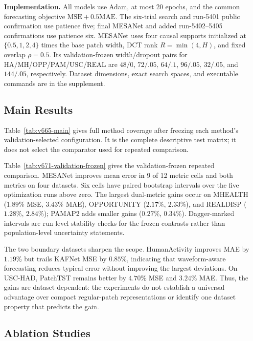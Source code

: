 \textbf{Implementation.}
All models use Adam, at most 20 epochs, and the common forecasting objective
$\mathrm{MSE}+0.5\mathrm{MAE}$. The six-trial search and run-5401 public
confirmation use patience five; final MESANet and added run-5402--5405
confirmations use patience six. MESANet uses four causal supports initialized
at $\{0.5,1,2,4\}$ times the base patch width, DCT rank $R=\min(4,H)$, and
fixed overlap $\rho=0.5$. Its validation-frozen width/dropout pairs for
HA/MH/OPP/PAM/USC/REAL are $48/0$, $72/.05$, $64/.1$, $96/.05$, $32/.05$,
and $144/.05$, respectively.
Dataset dimensions, exact search spaces, and executable commands are in the
supplement.

\subsection{Main Results}



Table~\ref{tab:v665-main} gives full method coverage after freezing each
method's validation-selected configuration. It is the complete descriptive
test matrix; it does not select the comparator used for repeated comparison.



Table~\ref{tab:v671-validation-frozen} gives the validation-frozen repeated
comparison. MESANet improves mean error in 9 of 12 metric cells and both
metrics on four datasets. Six cells have paired bootstrap intervals over the
five optimization runs above zero. The largest dual-metric gains occur on
MHEALTH ($1.89\%$ MSE,
$3.43\%$ MAE), OPPORTUNITY ($2.17\%$, $2.33\%$), and REALDISP ($1.28\%$,
$2.84\%$); PAMAP2 adds smaller gains ($0.27\%$, $0.34\%$). Dagger-marked
intervals are run-level stability checks for the frozen contrasts rather than
population-level uncertainty statements.

The two boundary datasets sharpen the scope. HumanActivity improves MAE by
$1.19\%$ but trails KAFNet MSE by $0.85\%$, indicating that waveform-aware
forecasting reduces typical error without improving the largest deviations.
On USC-HAD, PatchTST remains better by $4.70\%$ MSE and $3.24\%$ MAE. Thus,
the gains are dataset dependent: the experiments do not establish a universal
advantage over compact regular-patch representations or identify one dataset
property that predicts the gain.

\subsection{Ablation Studies}
\label{sec:ablation}

